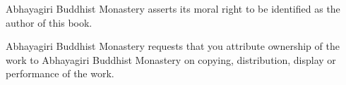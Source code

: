 {Abhayagiri Buddhist Monastery asserts its moral right to be identified as the author of this book.

Abhayagiri Buddhist Monastery requests that you attribute ownership of the work to Abhayagiri Buddhist Monastery on copying, distribution, display or performance of the work.

\thispagestyle{plain}

}
